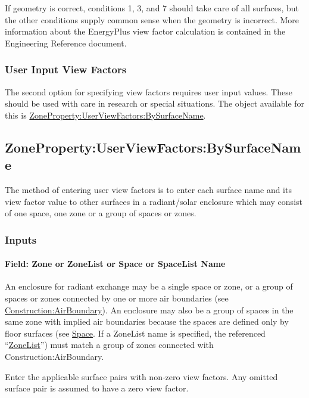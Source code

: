 If geometry is correct, conditions 1, 3, and 7 should take care of all surfaces, but the other conditions supply common sense when the geometry is incorrect. More information about the EnergyPlus view factor calculation is contained in the Engineering Reference document.

\subsubsection{User Input View Factors}\label{user-input-view-factors}

The second option for specifying view factors requires user input values. These should be used with care in research or special situations. The object available for this is \hyperref[zonepropertyuserviewfactorsbysurfacename]{ZoneProperty:UserViewFactors:BySurfaceName}.

\subsection{ZoneProperty:UserViewFactors:BySurfaceName}\label{zonepropertyuserviewfactorsbysurfacename}

The method of entering user view factors is to enter each surface name and its view factor value to other
surfaces in a radiant/solar enclosure which may consist of one space, one zone or a group of spaces or zones.

\subsubsection{Inputs}\label{inputs-17}

\paragraph{Field: Zone or ZoneList or Space or SpaceList Name}\label{zonepropertyuserviewfactorsbysurfacename-field-zone-name}

An enclosure for radiant exchange may be a single space or zone, or a group of spaces or zones connected by one or more air boundaries (see \hyperref[constructionairboundary]{Construction:AirBoundary}).  An enclosure may also be a group of spaces in the same zone with implied air boundaries because the spaces are defined only by floor surfaces (see \hyperref[space]{Space}. 
If a ZoneList name is specified, the referenced ``\hyperref[zonelist]{ZoneList}'') must match a group of zones connected with Construction:AirBoundary.

Enter the applicable surface pairs with non-zero view factors. Any omitted surface pair is assumed to have a zero view factor.

